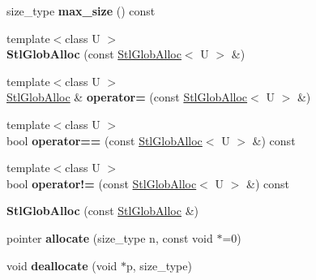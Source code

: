 \begin{DoxyCompactItemize}
\item 
\hypertarget{classStlGlobAlloc_a2e80596606adaaf13901ef834a7f7664}{size\-\_\-type {\bfseries max\-\_\-size} () const }\label{classStlGlobAlloc_a2e80596606adaaf13901ef834a7f7664}

\item 
\hypertarget{classStlGlobAlloc_a9f71e9ec95028cd38b746184e966a6aa}{{\footnotesize template$<$class U $>$ }\\{\bfseries Stl\-Glob\-Alloc} (const \hyperlink{classStlGlobAlloc}{Stl\-Glob\-Alloc}$<$ U $>$ \&)}\label{classStlGlobAlloc_a9f71e9ec95028cd38b746184e966a6aa}

\item 
\hypertarget{classStlGlobAlloc_a8a8289705c81832f091a7aabca6b2bfb}{{\footnotesize template$<$class U $>$ }\\\hyperlink{classStlGlobAlloc}{Stl\-Glob\-Alloc} \& {\bfseries operator=} (const \hyperlink{classStlGlobAlloc}{Stl\-Glob\-Alloc}$<$ U $>$ \&)}\label{classStlGlobAlloc_a8a8289705c81832f091a7aabca6b2bfb}

\item 
\hypertarget{classStlGlobAlloc_af3c45b58386a804323f79d1664b8641c}{{\footnotesize template$<$class U $>$ }\\bool {\bfseries operator==} (const \hyperlink{classStlGlobAlloc}{Stl\-Glob\-Alloc}$<$ U $>$ \&) const }\label{classStlGlobAlloc_af3c45b58386a804323f79d1664b8641c}

\item 
\hypertarget{classStlGlobAlloc_abf98d4b1fd59bc77b1ecbe82c2917520}{{\footnotesize template$<$class U $>$ }\\bool {\bfseries operator!=} (const \hyperlink{classStlGlobAlloc}{Stl\-Glob\-Alloc}$<$ U $>$ \&) const }\label{classStlGlobAlloc_abf98d4b1fd59bc77b1ecbe82c2917520}

\item 
\hypertarget{classStlGlobAlloc_a5761db15bab8fab9d543a03991d16f3e}{{\bfseries Stl\-Glob\-Alloc} (const \hyperlink{classStlGlobAlloc}{Stl\-Glob\-Alloc} \&)}\label{classStlGlobAlloc_a5761db15bab8fab9d543a03991d16f3e}

\item 
\hypertarget{classStlGlobAlloc_af4083b056fdc8da831d153dbdc5b1669}{pointer {\bfseries allocate} (size\-\_\-type n, const void $\ast$=0)}\label{classStlGlobAlloc_af4083b056fdc8da831d153dbdc5b1669}

\item 
\hypertarget{classStlGlobAlloc_a87a14a9eef8ab88fef5845128db0dddd}{void {\bfseries deallocate} (void $\ast$p, size\-\_\-type)}\label{classStlGlobAlloc_a87a14a9eef8ab88fef5845128db0dddd}


\end{DoxyCompactItemize}
